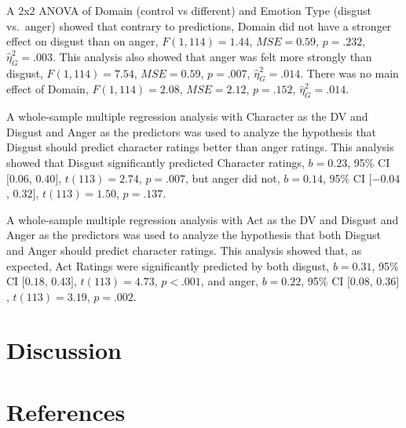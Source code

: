 \documentclass[man]{apa6}
\begin{document}
A 2x2 ANOVA of Domain (control vs different) and Emotion Type (disgust
vs.~anger) showed that contrary to predictions, Domain did not have a
stronger effect on disgust than on anger, \(F(1, 114) = 1.44\),
\(\mathit{MSE} = 0.59\), \(p = .232\), \(\hat{\eta}^2_G = .003\). This
analysis also showed that anger was felt more strongly than disgust,
\(F(1, 114) = 7.54\), \(\mathit{MSE} = 0.59\), \(p = .007\),
\(\hat{\eta}^2_G = .014\). There was no main effect of Domain,
\(F(1, 114) = 2.08\), \(\mathit{MSE} = 2.12\), \(p = .152\),
\(\hat{\eta}^2_G = .014\).

A whole-sample multiple regression analysis with Character as the DV and
Disgust and Anger as the predictors was used to analyze the hypothesis
that Disgust should predict character ratings better than anger ratings.
This analysis showed that Disgust significantly predicted Character
ratings, \(b = 0.23\), 95\% CI \([0.06\), \(0.40]\), \(t(113) = 2.74\),
\(p = .007\), but anger did not, \(b = 0.14\), 95\% CI \([-0.04\),
\(0.32]\), \(t(113) = 1.50\), \(p = .137\).

A whole-sample multiple regression analysis with Act as the DV and
Disgust and Anger as the predictors was used to analyze the hypothesis
that both Disgust and Anger should predict character ratings. This
analysis showed that, as expected, Act Ratings were significantly
predicted by both disgust, \(b = 0.31\), 95\% CI \([0.18\), \(0.43]\),
\(t(113) = 4.73\), \(p < .001\), and anger, \(b = 0.22\), 95\% CI
\([0.08\), \(0.36]\), \(t(113) = 3.19\), \(p = .002\).

\section{Discussion}\label{discussion}

\newpage

\section{References}\label{references}

\begingroup
\setlength{\parindent}{-0.5in} \setlength{\leftskip}{0.5in}

\hypertarget{refs}{}

\endgroup
\end{document}
